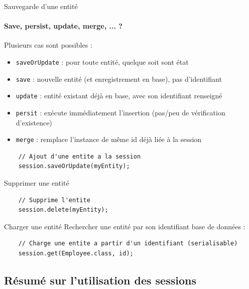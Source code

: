 \documentclass[compact]{beamer}%
\begin{document}
\begin{frame}[fragile]{Sauvegarde d'une entité}
 	\framesubtitle{Save, persist, update, merge, ... ?}
 	
	Plusieurs cas sont possibles :
	\begin{itemize}[<+->]
	\item \texttt{saveOrUpdate} : pour toute entité, quelque soit sont état
	\item \texttt{save} : nouvelle entité (et enregistrement en base), pas d'identifiant
	\item \texttt{update} : entité existant déjà en base, avec son identifiant renseigné 
	\item \texttt{persit} : exécute immédiatement l'insertion (pas/peu de vérification d'existence) 
	\item \texttt{merge} : remplace l'instance de même id déjà liée à la session
	\end{itemize}
	
	\begin{lstlisting}
	// Ajout d'une entite a la session
	session.saveOrUpdate(myEntity);
	\end{lstlisting}
	
\end{frame}

\begin{frame}[fragile]{Supprimer une entité}
	
	\begin{lstlisting}
	// Supprime l'entite
	session.delete(myEntity);
	\end{lstlisting}
\end{frame}


\begin{frame}[fragile]{Charger une entité}
	Rechercher une entité par son identifiant base de données :
	\begin{lstlisting}
	// Charge une entite a partir d'un identifiant (serialisable)
	session.get(Employee.class, id);
	\end{lstlisting}
\end{frame}
	
\subsection{Résumé sur l'utilisation des sessions}
\end{document}
